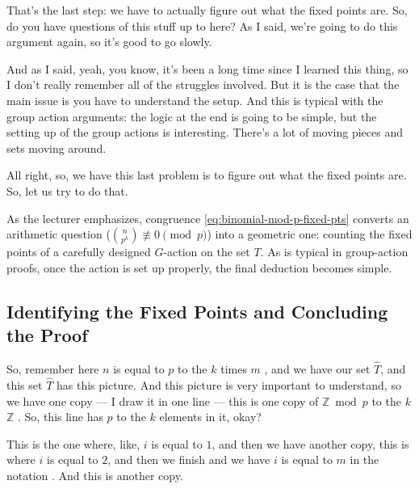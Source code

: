 \begin{proofWrapper}
\begin{speech}[00:59:55 - 01:01:12]
That's the last step: we have to actually figure out what the fixed points are. So, do you have questions of this stuff up to here? As I said, we're going to do this argument again, so it's good to go slowly.

And as I said, yeah, you know, it's been a long time since I learned this thing, so I don't really remember all of the struggles involved. But it is the case that the main issue is you have to understand the setup. And this is typical with the group action arguments: the logic at the end is going to be simple, but the setting up of the group actions is interesting. There's a lot of moving pieces and sets moving around.

All right, so, we have this last problem is to figure out what the fixed points are. So, let us try to do that.
\end{speech}

\begin{insight}
As the lecturer emphasizes, congruence \eqref{eq:binomial-mod-p-fixed-pts} converts an arithmetic question ($\binom{n}{p^k} \not\equiv 0 \pmod{p}$) into a geometric one: counting the fixed points of a carefully designed $G$-action on the set $T$. As is typical in group-action proofs, once the action is set up properly, the final deduction becomes simple.
\end{insight}

\subsection{Identifying the Fixed Points and Concluding the Proof}

\begin{speech}[01:01:58 - 01:03:08]
So, remember here $n$ is equal to $p$ to the $k$ times $m$ , and we have our set $\widehat{T}$, and this set $\widehat{T}$ has this picture. And this picture is very important to understand, so we have one copy --- I draw it in one line --- this is one copy of $\mathbb{Z} \bmod p$ to the $k$ $\mathbb{Z}$ . So, this line has $p$ to the $k$ elements in it, okay?

This is the one where, like, $i$ is equal to $1$, and then we have another copy, this is where $i$ is equal to $2$, and then we finish and we have $i$ is equal to $m$ in the notation . And this is another copy.


\end{speech}
\end{proofWrapper}
